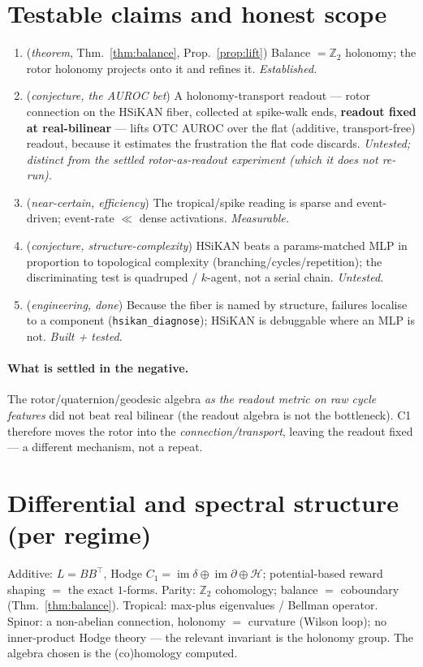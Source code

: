 \documentclass[11pt]{article}
\theoremstyle{definition}
\theoremstyle{plain}
\theoremstyle{remark}
\newcommand{\Z}{\mathbb{Z}}
\begin{document}
\section{Testable claims and honest scope}
\begin{enumerate}[nosep,leftmargin=1.5em]
  \item[\textbf{T1}] (\emph{theorem}, Thm.~\ref{thm:balance}, Prop.~\ref{prop:lift}) Balance $=\Z_2$ holonomy; the
        rotor holonomy projects onto it and refines it. \emph{Established.}
  \item[\textbf{C1}] (\emph{conjecture, the AUROC bet}) A holonomy-transport readout --- rotor connection on the
        HSiKAN fiber, collected at spike-walk ends, \textbf{readout fixed at real-bilinear} --- lifts OTC AUROC
        over the flat (additive, transport-free) readout, because it estimates the frustration the flat code
        discards. \emph{Untested; distinct from the settled rotor-as-readout experiment (which it does not
        re-run).}
  \item[\textbf{C2}] (\emph{near-certain, efficiency}) The tropical/spike reading is sparse and event-driven;
        event-rate $\ll$ dense activations. \emph{Measurable.}
  \item[\textbf{C3}] (\emph{conjecture, structure-complexity}) HSiKAN beats a params-matched MLP in proportion to
        topological complexity (branching/cycles/repetition); the discriminating test is quadruped / $k$-agent,
        not a serial chain. \emph{Untested.}
  \item[\textbf{E1}] (\emph{engineering, done}) Because the fiber is named by structure, failures localise to a
        component (\texttt{hsikan\_diagnose}); HSiKAN is debuggable where an MLP is not. \emph{Built + tested.}
\end{enumerate}
\paragraph{What is settled in the negative.} The rotor/quaternion/geodesic algebra \emph{as the readout metric on
raw cycle features} did not beat real bilinear (the readout algebra is not the bottleneck). C1 therefore moves the
rotor into the \emph{connection/transport}, leaving the readout fixed --- a different mechanism, not a repeat.

\section{Differential and spectral structure (per regime)}
Additive: $L=BB^{\!\top}$, Hodge $C_1=\operatorname{im}\delta\oplus\operatorname{im}\partial\oplus\mathcal H$;
potential-based reward shaping $=$ the exact $1$-forms. Parity: $\Z_2$ cohomology; balance $=$ coboundary
(Thm.~\ref{thm:balance}). Tropical: max-plus eigenvalues / Bellman operator. Spinor: a non-abelian connection,
holonomy $=$ curvature (Wilson loop); no inner-product Hodge theory --- the relevant invariant is the holonomy
group. The algebra chosen is the (co)homology computed.
\end{document}
